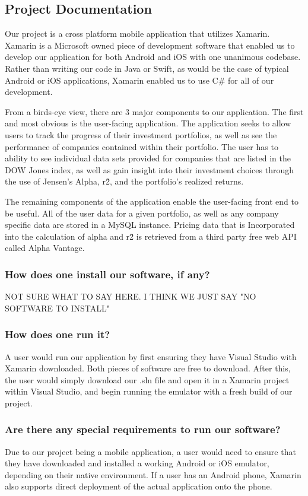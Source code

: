 \documentclass{article}
\begin{document}
\subsection{Project Documentation}
Our project is a cross platform mobile application that utilizes Xamarin. Xamarin is a Microsoft owned piece of development software that enabled us to develop our application for both Android and iOS with one unanimous codebase. Rather than writing our code in Java or Swift, as would be the case of typical Android or iOS applications, Xamarin enabled us to use C# for all of our development.

From a birds-eye view, there are 3 major components to our application. The first and most obvious is the user-facing application. The application seeks to allow users to track the progress of their investment portfolios, as well as see the performance of companies contained within their portfolio. The user has to ability to see individual data sets provided for companies that are listed in the DOW Jones index, as well as gain insight into their investment choices through the use of Jensen's Alpha, r\^2, and the portfolio's realized returns.

The remaining components of the application enable the user-facing front end to be useful. All of the user data for a given portfolio, as well as any company specific data are stored in a MySQL instance. Pricing data that is Incorporated into the calculation of alpha and r\^2 is retrieved from a third party free web API called Alpha Vantage. 


\subsubsection{How does one install our software, if any?}
NOT SURE WHAT TO SAY HERE. I THINK WE JUST SAY "NO SOFTWARE TO INSTALL"
\subsubsection{How does one run it?}
A user would run our application by first ensuring they have Visual Studio with Xamarin downloaded. Both pieces of software are free to download. After this, the user would simply download our .sln file and open it in a Xamarin project within Visual Studio, and begin running the emulator with a fresh build of our project.
\subsubsection{Are there any special requirements to run our software?}
Due to our project being a mobile application, a user would need to ensure that they have downloaded and installed a working Android or iOS emulator, depending on their native environment. If a user has an Android phone, Xamarin also supports direct deployment of the actual application onto the phone.
\end{document}
